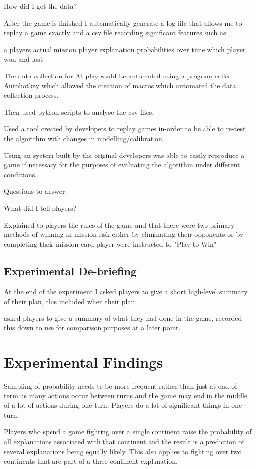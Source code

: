 \documentclass[parskip]{cs4rep}
\begin{document}
How did I get the data?

After the game is finished I automatically generate a log file that allows me to replay a game exactly and a csv file recording significant features such as:

a players actual mission
player explanation probabilities over time
which player won and lost

The data collection for AI play could be automated using a program called Autohotkey which allowed the creation of macros which automated the data collection process. 

Then used python scripts to analyse the csv files.

Used a tool created by developers to replay games in-order to be able to re-test the algorithm with changes in modelling/calibration.

Using an system built by the original developers was able to easily reproduce a game if necessary for the purposes of evaluating the algorithm under different conditions.

Questions to answer:

What did I tell players?

Explained to players the rules of the game and that there were two primary methods of winning in mission risk either by eliminating their opponents or by completing their mission card player were instructed to "Play to Win"

\subsection{Experimental De-briefing}

At the end of the experiment I asked players to give a short high-level summary of their plan, this included when their plan

asked players to give a summary of what they had done in the game, recorded this down to use for comparison purposes at a later point.

\section{Experimental Findings}

Sampling of probability needs to be more frequent rather than just at end of term as many actions occur between turns and the game may end in the middle of a lot of actions during one turn. Players do a lot of significant things in one turn.

Players who spend a game fighting over a single continent raise the probability of all explanations associated with that continent and the result is a prediction of several explanations being equally likely. This also applies to fighting over two continents that are part of a three continent explanation.
\end{document}
